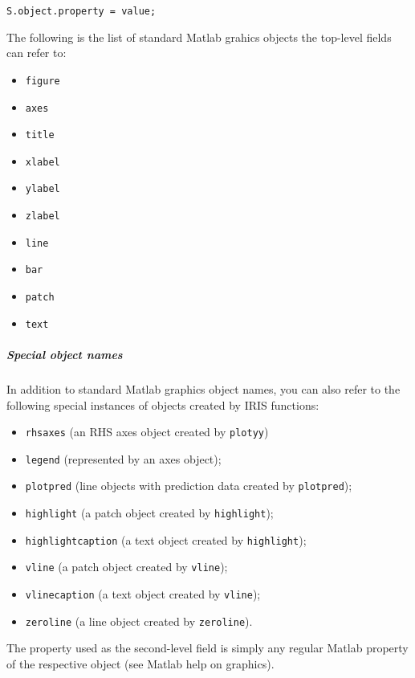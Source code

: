\begin{verbatim}
S.object.property = value;
\end{verbatim}

The following is the list of standard Matlab grahics objects the
top-level fields can refer to:

\begin{itemize}
\itemsep1pt\parskip0pt
\item
  \texttt{figure}
\item
  \texttt{axes}
\item
  \texttt{title}
\item
  \texttt{xlabel}
\item
  \texttt{ylabel}
\item
  \texttt{zlabel}
\item
  \texttt{line}
\item
  \texttt{bar}
\item
  \texttt{patch}
\item
  \texttt{text}
\end{itemize}

\subparagraph{Special object names}\label{special-object-names}

In addition to standard Matlab graphics object names, you can also refer
to the following special instances of objects created by IRIS functions:

\begin{itemize}
\itemsep1pt\parskip0pt
\item
  \texttt{rhsaxes} (an RHS axes object created by \texttt{plotyy})
\item
  \texttt{legend} (represented by an axes object);
\item
  \texttt{plotpred} (line objects with prediction data created by
  \texttt{plotpred});
\item
  \texttt{highlight} (a patch object created by \texttt{highlight});
\item
  \texttt{highlightcaption} (a text object created by
  \texttt{highlight});
\item
  \texttt{vline} (a patch object created by \texttt{vline});
\item
  \texttt{vlinecaption} (a text object created by \texttt{vline});
\item
  \texttt{zeroline} (a line object created by \texttt{zeroline}).
\end{itemize}

The property used as the second-level field is simply any regular Matlab
property of the respective object (see Matlab help on graphics).

